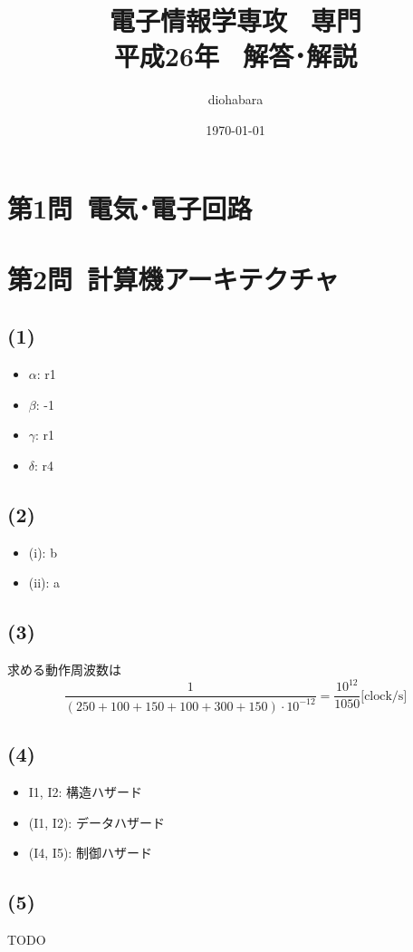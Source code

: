 \documentclass[a4paper,12pt,xelatex,ja=standard]{bxjsarticle}
\title{電子情報学専攻 \, 専門 \\ 平成26年 \, 解答･解説}
\author{diohabara}
\date{\today}
\begin{document}
\maketitle

\section*{第1問\ 電気･電子回路}

\section*{第2問\ 計算機アーキテクチャ}
\subsection*{(1)}
\begin{itemize}
  \item $\alpha$: r1
  \item $\beta$: -1
  \item $\gamma$: r1
  \item $\delta$: r4
\end{itemize}

\subsection*{(2)}
\begin{itemize}
  \item (i): b
  \item (ii): a
\end{itemize}

\subsection*{(3)}
求める動作周波数は
\[
  \frac{1}{(250 + 100 + 150 + 100 + 300 + 150) \cdot 10^{-12}} = \frac{10^{12}}{1050}\text{[clock/s]}
\]

\subsection*{(4)}
\begin{itemize}
  \item I1, I2: 構造ハザード
  \item (I1, I2): データハザード
  \item (I4, I5): 制御ハザード
\end{itemize}

\subsection*{(5)}
TODO
\end{document}
